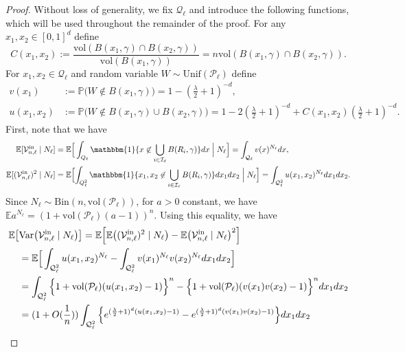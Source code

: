 \documentclass[11pt]{article}
\newcommand{\E}{\mathbb{E}}
\newcommand{\mQ}{\mathcal{Q}}
\newcommand{\vol}{\mathrm{vol}}
\newcommand{\var}{\mathrm{Var}}
\newcommand{\bone}{\mathbbm{1}}
\begin{document}
\begin{proof}
    Without loss of generality, we fix $\mathcal{Q}_\ell$ and introduce the following functions, which will be used throughout the remainder of the proof. For any $x_1, x_2\in[0, 1]^d$ define
    \[
	        C(x_1, x_2) := \frac{\vol(B(x_1, \gamma)\cap B(x_2, \gamma))}{\vol(B(x_1, \gamma))} = n \vol(B(x_1, \gamma)\cap B(x_2, \gamma)).
    \]
    For $x_1, x_2\in\mathcal{Q}_\ell$ and random variable $W\sim\mathrm{Unif}(\mathcal{P}_\ell)$ define
    \begin{align*}
        v(x_1) &:= \mathbb{P}\big(W\not\in B(x_1, \gamma)\big) = 1 - (\frac{\lambda}{2} + 1)^{-d},\\
        u(x_1, x_2) &:= \mathbb{P}\big(W\not\in B(x_1, \gamma)\cup B(x_2, \gamma)\big) = 1 - 2(\frac{\lambda}{2} + 1)^{-d} + C(x_1, x_2)(\frac{\lambda}{2} + 1)^{-d}.
    \end{align*}
    First, note that we have
    \begin{align*}
        \E[\mathcal{V}_{n, \ell}^{\mathrm{in}}\mid N_\ell] &= \E\Big[\int_{Q_\ell}\bone\{x\not\in \bigcup_{i\in\mathcal{I}_\ell} B(R_i, \gamma)\}dx\Bigm| N_\ell\Big] = \int_{\mQ_\ell} v(x)^{N_\ell} dx, \\
        \E[(\mathcal{V}_{n, \ell}^{\mathrm{in}})^2\mid N_\ell] &= \E\Bigl[ \int_{Q_\ell^2}\bone\{x_1, x_2\not\in \bigcup_{i\in\mathcal{I}_\ell} B(R_i, \gamma)\} dx_1dx_2\Bigm| N_\ell\Bigr] = \int_{\mQ_\ell^2} u(x_1, x_2)^{N_\ell}dx_1 dx_2.
    \end{align*}
    Since $N_\ell\sim\mathrm{Bin}(n, \vol(\mathcal{P}_\ell))$, for $a > 0$ constant, we have $\E a^{N_\ell} = (1 + \vol(\mathcal{P}_\ell)(a - 1))^n$. Using this equality, we have 
    \begin{align*}
        \E\bigl[&\var\bigl(\mathcal{V}_{n, \ell}^\mathrm{in}\mid N_\ell\bigr) \bigr] = \E\Bigl[ \E \bigl((\mathcal{V}_{n, \ell}^\mathrm{in})^2\mid N_\ell\bigr) - \E\bigl(\mathcal{V}_{n, \ell}^\mathrm{in} \mid N_\ell\bigr)^2 \Bigr] \notag \\
        &= \E\Big[\int_{\mQ_\ell^2} u(x_1, x_2)^{N_\ell} - \int_{\mQ_\ell^2}v(x_1)^{N_\ell}v(x_2)^{N_\ell}dx_1 dx_2\Big] \notag\\
        &= \int_{\mQ_\ell^2} \Big\{1 + \vol(\mathcal{P}_\ell)(u(x_1, x_2) - 1)\Big\}^n - \Big\{1 + \vol(\mathcal{P}_\ell)(v(x_1)v(x_2) - 1)\Big\}^n dx_1 dx_2\notag \\
        &= (1 + O(\frac{1}{n}))\int_{\mQ_\ell^2} \Big\{e^{(\frac{\lambda}{2} + 1)^d(u(x_1, x_2) - 1)} - e^{(\frac{\lambda}{2} + 1)^d(v(x_1)v(x_2) - 1)}\Big\}dx_1 dx_2 \notag \\

\end{align*}
\end{proof}
\end{document}
